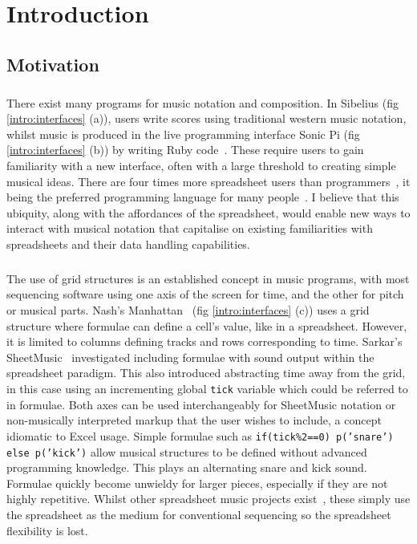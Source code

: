 
\chapter{Introduction}

\vspace{-20pt}
\section{Motivation}

\paragraph{} There exist many programs for music notation and composition. In Sibelius (fig \ref{intro:interfaces} (a)), users write scores using traditional western music notation, whilst music is produced in the live programming interface Sonic Pi (fig \ref{intro:interfaces} (b)) by writing Ruby code~\cite{aaron:pi}. These require users to gain familiarity with a new interface, often with a large threshold to creating simple musical ideas. There are four times more spreadsheet users than programmers~\cite{scaffidi:estimating}, it being the preferred programming language for many people~\cite{blackwell:functions}. I believe that this ubiquity, along with the affordances of the spreadsheet, would enable new ways to interact with musical notation that capitalise on existing familiarities with spreadsheets and their data handling capabilities.

\paragraph{} The use of grid structures is an established concept in music programs, with most sequencing software using one axis of the screen for time, and the other for pitch or musical parts. Nash's Manhattan~\cite{nash:manhattan} (fig \ref{intro:interfaces} (c)) uses a grid structure where formulae can define a cell's value, like in a spreadsheet. However, it is limited to columns defining tracks and rows corresponding to time. Sarkar's SheetMusic~\cite{sarkar:sheetmusic} investigated including formulae with sound output within the spreadsheet paradigm. This also introduced abstracting time away from the grid, in this case using an incrementing global \texttt{tick} variable which could be referred to in formulae. Both axes can be used interchangeably for SheetMusic notation or non-musically interpreted markup that the user wishes to include, a concept idiomatic to Excel usage. Simple formulae such as \texttt{if(tick\%2==0) p('snare') else p('kick')} allow musical structures to be defined without advanced programming knowledge. This plays an alternating snare and kick sound. Formulae quickly become unwieldy for larger pieces, especially if they are not highly repetitive. Whilst other spreadsheet music projects exist~\cite{hackaday:spreadsheet}, these simply use the spreadsheet as the medium for conventional sequencing so the spreadsheet flexibility is lost.

